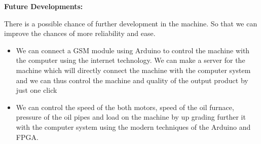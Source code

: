 \documentclass[14pt]{report}
\begin{document}
\textbf{Future Developments:}

There is a possible chance of further development in the machine. So that we can improve the chances of more reliability and ease. 

\begin{itemize}
\item We can connect a GSM module using Arduino to control the machine with the computer using the internet technology. We can make a server for the machine which will directly connect the machine with the computer system and we can thus control the machine and quality of the output product by just one click

\item We can control the speed of the both motors, speed of the oil furnace, pressure of the oil pipes and load on the machine by up grading further it with the computer system using the modern techniques of the Arduino and FPGA.
\end{itemize}



\end{document}
